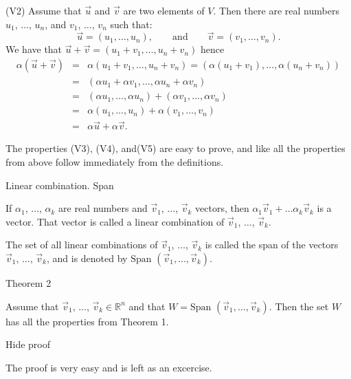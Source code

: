     (V2) Assume that \( \overrightarrow u \) and \( \overrightarrow v \) are two elements of \( V \). Then there are real numbers \( u_1 \), \( \dots \), \( u_n \), and \( v_1 \), \( \dots \), \( v_n \) such that: \[ \overrightarrow u=\left(u_1,\dots, u_n\right),\quad\quad \mbox{and}\quad\quad \overrightarrow v=\left(v_1,\dots, v_n\right).\] We have that \( \overrightarrow u+\overrightarrow v=\left(u_1+v_1,\dots, u_n+v_n\right) \) hence \begin{eqnarray*}\alpha(\overrightarrow u+\overrightarrow v)&=&\alpha\left(u_1+v_1,\dots, u_n+v_n\right)=\left(\alpha(u_1+v_1),\dots, \alpha(u_n+v_n)\right)\\ &=&\left(\alpha u_1+\alpha v_1, \dots, \alpha u_n+\alpha v_n\right)\\ &=&\left(\alpha u_1, \dots, \alpha u_n\right)+\left(\alpha v_1, \dots, \alpha v_n\right)\\ &=&\alpha\left(u_1,\dots, u_n\right)+\alpha\left(v_1,\dots, v_n\right)\\ &=&\alpha \overrightarrow u+\alpha \overrightarrow v.\end{eqnarray*}

    The properties (V3), (V4), and(V5) are easy to prove, and like all the properties from above follow immediately from the definitions.

Linear combination. Span

If \( \alpha_1 \), \( \dots \), \( \alpha_k \) are real numbers and \( \overrightarrow v_1 \), \( \dots \), \( \overrightarrow v_k \) vectors, then \( \alpha_1\overrightarrow v_1+\dots \alpha_k\overrightarrow v_k \) is a vector. That vector is called a linear combination of \( \overrightarrow v_1 \), \( \dots \), \( \overrightarrow v_k \).

The set of all linear combinations of \( \overrightarrow v_1 \), \( \dots \), \( \overrightarrow v_k \) is called the span of the vectors \( \overrightarrow v_1 \), \( \dots \), \( \overrightarrow v_k \), and is denoted by \( \mbox{Span }(\overrightarrow v_1, \dots, \overrightarrow v_k) \).

Theorem 2

Assume that \( \overrightarrow v_1 \), \( \dots \), \( \overrightarrow v_k\in\mathbb R^n \) and that \( W=\mbox{Span }(\overrightarrow v_1, \dots, \overrightarrow v_k) \). Then the set \( W \) has all the properties from Theorem 1.

Hide proof

The proof is very easy and is left as an excercise.

